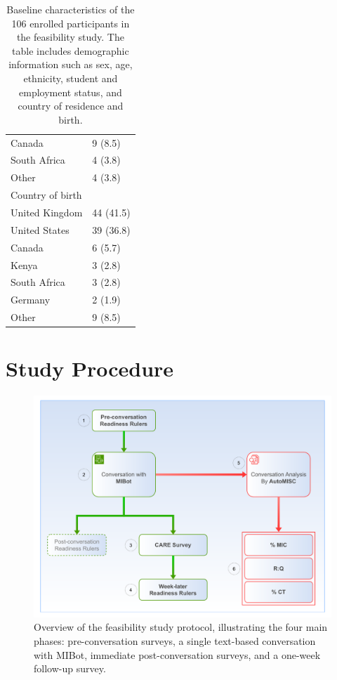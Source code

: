 \begin{table}[htbp]
\begin{tabular}{l l}
\quad Canada & 9 (8.5) \\
\quad South Africa & 4 (3.8) \\
\quad Other & 4 (3.8) \\
\hline
Country of birth & \\
\quad United Kingdom & 44 (41.5) \\
\quad United States & 39 (36.8) \\
\quad Canada & 6 (5.7) \\
\quad Kenya & 3 (2.8) \\
\quad South Africa & 3 (2.8) \\
\quad Germany & 2 (1.9) \\
\quad Other & 9 (8.5) \\
\hline
\end{tabular}
\caption[Baseline Characteristics of Enrolled Participants]{Baseline characteristics of the 106 enrolled participants in the feasibility study. The table includes demographic information such as sex, age, ethnicity, student and employment status, and country of residence and birth.}
\label{tab:participant-characteristics}
\end{table}

\section{Study Procedure}
\begin{figure}[ht]
    \centering
    \includegraphics[width=0.9\linewidth]{fig/feasibility_study_flow.pdf}
    \caption[Feasibility Study Protocol Overview]{Overview of the feasibility study protocol, illustrating the four main phases: pre-conversation surveys, a single text-based conversation with MIBot, immediate post-conversation surveys, and a one-week follow-up survey.}
    \label{fig:study-flow}
\end{figure}

